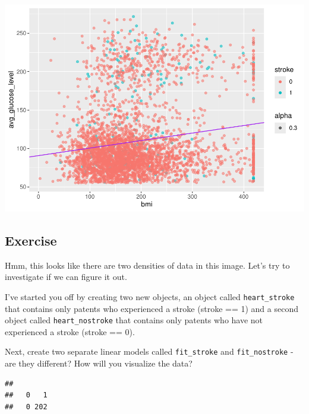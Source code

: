 \documentclass[
]{book}
\newenvironment{Shaded}{\begin{snugshade}}{\end{snugshade}}
\newcommand{\DecValTok}[1]{\textcolor[rgb]{0.00,0.00,0.81}{#1}}
\newcommand{\FunctionTok}[1]{\textcolor[rgb]{0.13,0.29,0.53}{\textbf{#1}}}
\newcommand{\NormalTok}[1]{#1}
\newcommand{\OtherTok}[1]{\textcolor[rgb]{0.56,0.35,0.01}{#1}}
\newcommand{\SpecialCharTok}[1]{\textcolor[rgb]{0.81,0.36,0.00}{\textbf{#1}}}
\begin{document}
\includegraphics{_main_files/figure-latex/unnamed-chunk-102-1.pdf}

\subsection{Exercise}\label{exercise-9}

Hmm, this looks like there are two densities of data in this image. Let's try to investigate if we can figure it out.

I've started you off by creating two new objects, an object called \texttt{heart\_stroke} that contains only patents who experienced a stroke (stroke == 1) and a second object called \texttt{heart\_nostroke} that contains only patents who have not experienced a stroke (stroke == 0).

Next, create two separate linear models called \texttt{fit\_stroke} and \texttt{fit\_nostroke} - are they different? How will you visualize the data?

\begin{Shaded}
\end{Shaded}

\begin{verbatim}
## 
##   0   1 
##   0 202
\end{verbatim}

\begin{Shaded}
\end{Shaded}
\end{document}
